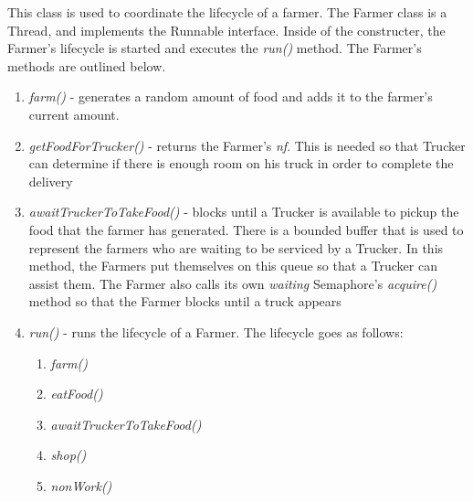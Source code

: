\documentclass[12pt]{article}
\begin{document}
\begin{enumerate}
            This class is used to coordinate the lifecycle of a farmer. The Farmer class is a Thread, and implements the Runnable interface. Inside of the constructer, the Farmer's lifecycle is started and executes the \textit{run()} method. The Farmer's methods are outlined below.
            \begin{enumerate}
                \item \textit{farm()} - generates a random amount of food and adds it to the farmer's current amount.
                \item \textit{getFoodForTrucker()} - returns the Farmer's \textit{nf}. This is needed so that Trucker can determine if there is enough room on his truck in order to complete the delivery
                \item \textit{awaitTruckerToTakeFood()} - blocks until a Trucker is available to pickup the food that the farmer has generated. There is a bounded buffer that is used to represent the farmers who are waiting to be serviced by a Trucker. In this method, the Farmers put themselves on this queue so that a Trucker can assist them. The Farmer also calls its own \textit{waiting} Semaphore's \textit{acquire()} method so that the Farmer blocks until a truck appears
                \item \textit{run()} - runs the lifecycle of a Farmer. The lifecycle goes as follows: 
                \begin{enumerate}
                    \item \textit{farm()}
                    \item \textit{eatFood()}
                    \item \textit{awaitTruckerToTakeFood()}
                    \item \textit{shop()}
                    \item \textit{nonWork()}
                \end{enumerate}
            
            \end{enumerate}
            

\end{enumerate}
\end{document}
